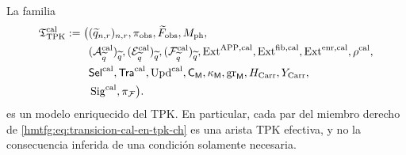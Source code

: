 \begin{proposition}
\label{hmtfg:prop:modelo-tpk-calibrado-ch}
La familia
\[
\begin{aligned}
 \mathfrak T_{\rm TPK}^{\rm cal}:=\bigl(
 &(\widetilde q_{n,r})_{n,r},\pi_{\rm obs},
   \widetilde F_{\rm obs},M_{\rm ph},\\
 &(\mathcal A_{\widetilde q}^{\rm cal})_{\widetilde q},
   (\mathcal E_{\widetilde q}^{\rm cal})_{\widetilde q},
   (\mathcal F_{\widetilde q}^{\rm cal})_{\widetilde q},
   \operatorname{Ext}^{\mathrm{APP},\rm cal},
   \operatorname{Ext}^{\rm fib,cal},
   \operatorname{Ext}^{\rm enr,cal},\rho^{\rm cal},\\
 &\mathsf{Sel}^{\rm cal},\mathsf{Tra}^{\rm cal},
   \operatorname{Upd}^{\rm cal},\mathsf C_{\mathsf M},
   \kappa_{\mathsf M},\operatorname{gr}_{\mathsf M},
   H_{\rm Carr},Y_{\rm Carr},\\
 &\operatorname{Sig}^{\rm cal},\pi_{\mathcal F}\bigr).
\end{aligned}
\]
es un modelo enriquecido del TPK. En particular, cada par del miembro derecho
de \eqref{hmtfg:eq:transicion-cal-en-tpk-ch} es una arista TPK efectiva, y no la
consecuencia inferida de una condición solamente necesaria.
\end{proposition}

